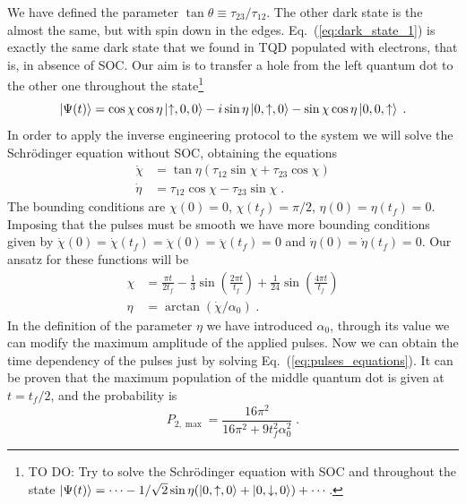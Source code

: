 \documentclass[a4paper,11pt]{article}
\begin{document}
We have defined the parameter $\tan\theta\equiv\tau_{23}/\tau_{12}$. The other dark state is the almost the same, but with spin down in the edges. Eq.~(\ref{eq:dark_state_1}) is exactly the same dark state that we found in TQD populated with electrons\cite{Ban2018}, that is, in absence of SOC. Our aim is to transfer a hole from the left quantum dot to the other one throughout the state\footnote{TO DO: Try to solve the Schrödinger equation with SOC and throughout the state $\ket{\Psi(t)}=\cdots -1/\sqrt{2}\sin\eta(\ket{0,\uparrow,0}+\ket{0,\downarrow,0})+\cdots$.}
\begin{equation}
	\ket{\Psi(t)}=\cos\chi\cos\eta\ket{\uparrow,0,0}-i\sin\eta\ket{0,\uparrow,0}-\sin\chi\cos\eta\ket{0,0,\uparrow}\; .
	\label{eq:ansatz_wave_fanction}
\end{equation}
In order to apply the inverse engineering protocol to the system we will solve the Schrödinger equation without SOC, obtaining the equations
\begin{equation}
	\begin{split}
	\dot{{\chi}}&=\tan\eta(\tau_{12}\sin\chi+\tau_{23}\cos\chi)\\
	\dot{\eta}&=\tau_{12}\cos\chi-\tau_{23}\sin\chi\; .
	\label{eq:pulses_equations}
	\end{split}
\end{equation}
The bounding conditions are $\chi(0)=0$, $\chi(t_f)=\pi/2$, $\eta(0)=\eta(t_f)=0$. Imposing that the pulses must be smooth we have more bounding conditions given by $\dot{\chi}(0)=\dot{\chi}(t_f)=\ddot{\chi}(0)=\ddot{\chi}(t_f)=0$ and $\dot{\eta}(0)=\dot{\eta}(t_f)=0$. Our ansatz for these functions will be
\begin{equation}
	\begin{split}
	\chi&=\frac{\pi t}{2t_f}-\frac{1}{3}\sin(\frac{2\pi t}{t_f})+\frac{1}{24}\sin(\frac{4\pi t}{t_f})\\
	\eta&=\arctan(\dot{\chi}/\alpha_0)\; .
	\end{split}
\end{equation}
In the definition of the parameter $\eta$ we have introduced $\alpha_0$, through its value we can modify the maximum amplitude of the applied pulses. Now we can obtain the time dependency of the pulses just by solving Eq.~(\ref{eq:pulses_equations}). It can be proven that the maximum population of the middle quantum dot is given at $t=t_f/2$, and the probability is
\begin{equation}
	P_{2,\max}=\frac{16\pi^2}{16\pi^2+9t_f^2\alpha_0^2}\; .
	\label{eq:P2_max}
\end{equation}
\end{document}
